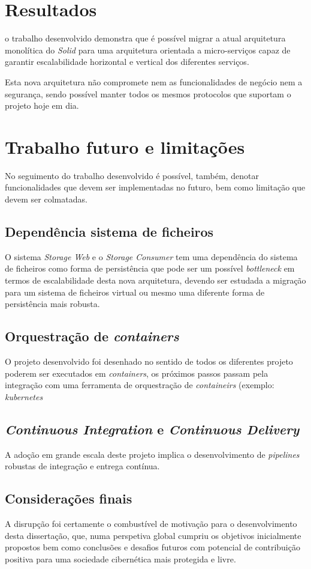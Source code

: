 \section{Resultados}
o trabalho desenvolvido demonstra que é possível migrar a atual arquitetura monolítica do \emph{Solid} para uma arquitetura orientada a micro-serviços capaz de garantir escalabilidade horizontal e vertical dos diferentes serviços.

Esta nova arquitetura não compromete nem as funcionalidades de negócio nem a segurança, sendo possível manter todos os mesmos protocolos que suportam o projeto hoje em dia.

\section{Trabalho futuro e limitações}

No seguimento do trabalho desenvolvido é possível, também, denotar funcionalidades que devem ser implementadas no futuro, bem como limitação que devem ser colmatadas.

\subsection{Dependência sistema de ficheiros}
O sistema \emph{Storage Web} e o \emph{Storage Consumer} tem uma dependência do sistema de ficheiros como forma de persistência que pode ser um possível \emph{bottleneck} em termos de escalabilidade desta nova arquitetura, devendo ser estudada a migração para um sistema de ficheiros virtual ou mesmo uma diferente forma de persistência mais robusta.
\subsection{Orquestração de \emph{containers}} O projeto desenvolvido foi desenhado no sentido de todos os diferentes projeto poderem ser executados em \emph{containers}, os próximos passos passam pela integração com uma ferramenta de orquestração de \emph{containeirs} (exemplo: \emph{kubernetes}
\subsection{\emph{Continuous Integration} e \emph{Continuous Delivery}}
A adoção em grande escala deste projeto implica o desenvolvimento de \emph{pipelines} robustas de integração e entrega contínua.

\subsection{Considerações finais}
A disrupção foi certamente o combustível de motivação para o desenvolvimento desta dissertação, que, numa perspetiva global cumpriu os objetivos inicialmente propostos bem como conclusões e desafios futuros com potencial de contribuição positiva para uma sociedade cibernética mais protegida e livre.